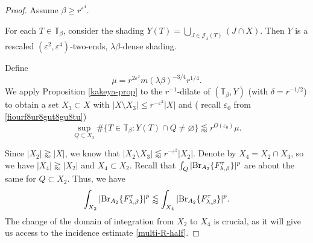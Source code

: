 \documentclass{amsart}%
\numberwithin{equation}{section}
\newcommand{\be}{\beta}
\newcommand{\e}{\varepsilon}
\newcommand{\la}{\lambda}
\newcommand{\cj}{\mathcal J}
\newcommand{\ZT}{\mathbb{T}}
\newcommand{\Br}{{\rm{Br}}}
\newcommand{\1}{\mathbbm{1}}
\begin{document}
\begin{proof}
	\medskip
	
	 Assume $\be\ge r^{\e^4}$.
    
	For each $T\in\ZT_{\be}$, consider the shading $Y(T)=\bigcup_{J\in\cj_\la(T)}(J\cap X)$.
	Then $Y$ is a rescaled $(\e^2, \e^{4})$-two-ends, $\la\be$-dense shading.
	
	
	\smallskip
	
	
	
	
	Define
	\begin{equation}
		\nonumber
		\mu=r^{2\e^{2}}m(\la\be)^{-3/4}r^{1/4}.
	\end{equation}
	We  apply Proposition \ref{kakeya-prop} to the $r^{-1}$-dilate of $(\ZT_\be, Y)$ (with $\delta=r^{-1/2}$) to obtain a set $X_3\subset X$ with
	 $|X\setminus X_3|\leq r^{-\e^2}|X|$ and ( recall $\e_0$ from \eqref{fiourf8ur8gut8gu8tu})
    \begin{equation}
		\label{multi-R-half}
		\sup_{Q\subset X_3}\#\{T\in\ZT_\be:Y(T)\cap Q\not=\varnothing\}\lessapprox r^{O(\e_0)}\mu.
	\end{equation}
	
	Since $|X_2|\gtrapprox |X|$, we know that  $|X_2\setminus X_3|\lessapprox r^{-\e^2}|X_2|$. 
	Denote by $X_4=X_2\cap X_3$, so we have $|X_4|\gtrapprox|X_2|$ and $X_4\subset X_2$. 
	Recall that $\int_{Q}|\Br_{A_2} \{F_{\lambda,\beta}^{\tau}\}|^p$
     are about the same for $Q\subset X_2$.
	Thus,  we have 
	\begin{equation}
		\label{bdbhdbvhhvbfdhvbhfb}\int_{X_2}|\Br_{A_2} \{F_{\lambda,\beta}^{\tau}\}|^p
		\lessapprox \int_{X_4}|\Br_{A_2} \{F_{\lambda,\beta}^{\tau}\}|^p.
	\end{equation}
    The change of the domain of integration from $X_2$ to $X_4$ is crucial, as it will give us access to the incidence estimate \eqref{multi-R-half}.
    

\end{proof}
\end{document}
